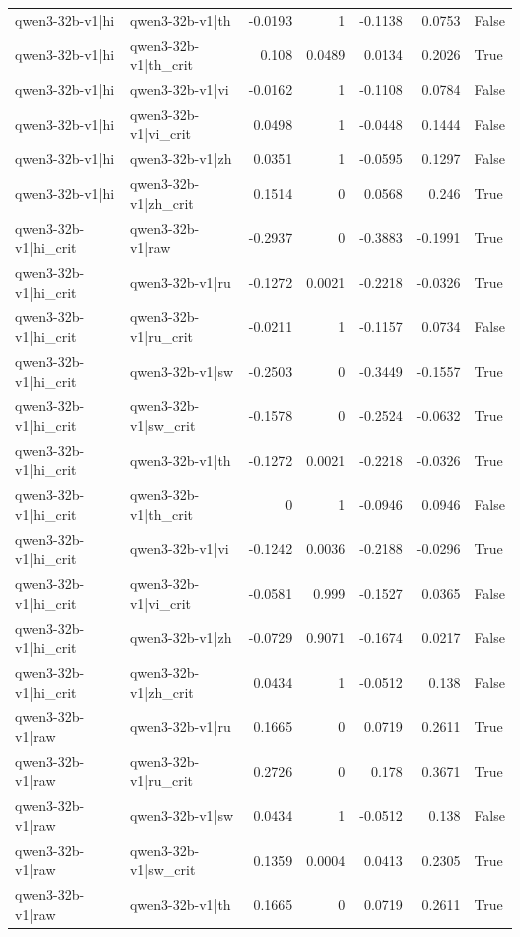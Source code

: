 \begin{table}
\begin{tabular}{l l r r r r l}
qwen3-32b-v1|hi & qwen3-32b-v1|th & -0.0193 & 1 & -0.1138 & 0.0753 & False \\
qwen3-32b-v1|hi & qwen3-32b-v1|th_crit & 0.108 & 0.0489 & 0.0134 & 0.2026 & True \\
qwen3-32b-v1|hi & qwen3-32b-v1|vi & -0.0162 & 1 & -0.1108 & 0.0784 & False \\
qwen3-32b-v1|hi & qwen3-32b-v1|vi_crit & 0.0498 & 1 & -0.0448 & 0.1444 & False \\
qwen3-32b-v1|hi & qwen3-32b-v1|zh & 0.0351 & 1 & -0.0595 & 0.1297 & False \\
qwen3-32b-v1|hi & qwen3-32b-v1|zh_crit & 0.1514 & 0 & 0.0568 & 0.246 & True \\
qwen3-32b-v1|hi_crit & qwen3-32b-v1|raw & -0.2937 & 0 & -0.3883 & -0.1991 & True \\
qwen3-32b-v1|hi_crit & qwen3-32b-v1|ru & -0.1272 & 0.0021 & -0.2218 & -0.0326 & True \\
qwen3-32b-v1|hi_crit & qwen3-32b-v1|ru_crit & -0.0211 & 1 & -0.1157 & 0.0734 & False \\
qwen3-32b-v1|hi_crit & qwen3-32b-v1|sw & -0.2503 & 0 & -0.3449 & -0.1557 & True \\
qwen3-32b-v1|hi_crit & qwen3-32b-v1|sw_crit & -0.1578 & 0 & -0.2524 & -0.0632 & True \\
qwen3-32b-v1|hi_crit & qwen3-32b-v1|th & -0.1272 & 0.0021 & -0.2218 & -0.0326 & True \\
qwen3-32b-v1|hi_crit & qwen3-32b-v1|th_crit & 0 & 1 & -0.0946 & 0.0946 & False \\
qwen3-32b-v1|hi_crit & qwen3-32b-v1|vi & -0.1242 & 0.0036 & -0.2188 & -0.0296 & True \\
qwen3-32b-v1|hi_crit & qwen3-32b-v1|vi_crit & -0.0581 & 0.999 & -0.1527 & 0.0365 & False \\
qwen3-32b-v1|hi_crit & qwen3-32b-v1|zh & -0.0729 & 0.9071 & -0.1674 & 0.0217 & False \\
qwen3-32b-v1|hi_crit & qwen3-32b-v1|zh_crit & 0.0434 & 1 & -0.0512 & 0.138 & False \\
qwen3-32b-v1|raw & qwen3-32b-v1|ru & 0.1665 & 0 & 0.0719 & 0.2611 & True \\
qwen3-32b-v1|raw & qwen3-32b-v1|ru_crit & 0.2726 & 0 & 0.178 & 0.3671 & True \\
qwen3-32b-v1|raw & qwen3-32b-v1|sw & 0.0434 & 1 & -0.0512 & 0.138 & False \\
qwen3-32b-v1|raw & qwen3-32b-v1|sw_crit & 0.1359 & 0.0004 & 0.0413 & 0.2305 & True \\
qwen3-32b-v1|raw & qwen3-32b-v1|th & 0.1665 & 0 & 0.0719 & 0.2611 & True \\

\end{tabular}
\end{table}
